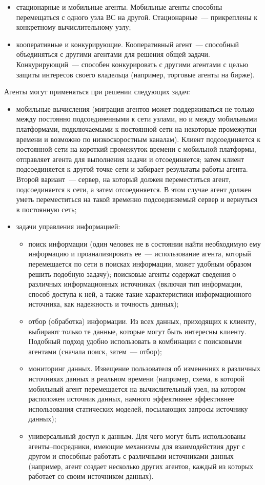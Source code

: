 \begin{itemize}
    \item стационарные и мобильные агенты. Мобильные агенты способны перемещаться с одного узла ВС на другой. Стационарные~--- прикреплены к конкретному вычислительному узлу;

    \item кооперативные и конкурирующие. Кооперативный агент~--- способный объединяться с другими агентами для решения общей задачи. Конкурирующий~--- способен конкурировать с другими агентами с целью защиты интересов своего владельца (например, торговые агенты на бирже).
\end{itemize}

Агенты могут применяться при решении следующих задач:
\begin{itemize}
\item мобильные вычисления (миграция агентов может поддерживаться не только между постоянно подсоединенными к сети узлами, но и между мобильными платформами, подключаемыми к постоянной сети на некоторые промежутки времени и возможно по низкоскоростным каналам). Клиент подсоединяется к постоянной сети на короткий промежуток времени с мобильной платформы, отправляет агента для выполнения задачи и отсоединяется; затем клиент подсоединяется к другой точке сети и забирает результаты работы агента. Второй вариант~--- сервер, на который должен переместиться агент, подсоединяется к сети, а затем отсоединяется. В этом случае агент должен уметь переместиться на такой временно подсоединяемый сервер и вернуться в постоянную сеть;
\item задачи управления информацией:
    \begin{itemize}
    \item поиск информации (один человек не в состоянии найти необходимую ему информацию и проанализировать ее~--- использование агента, который перемещается по сети в поисках информации, может удобным образом решить подобную задачу); поисковые агенты содержат сведения о различных информационных источниках (включая тип информации, способ доступа к ней, а также такие характеристики информационного источника, как надежность и точность данных);
    \item отбор (обработка) информации. Из всех данных, приходящих к клиенту, выбирают только те данные, которые могут быть интересны клиенту. Подобный подход удобно использовать в комбинации с поисковыми агентами (сначала поиск, затем~--- отбор);
    \item мониторинг данных. Извещение пользователя об изменениях в различных источниках данных в реальном времени (например, схема, в которой мобильный агент перемещается на вычислительный узел, на котором расположен источник данных, намного эффективнее эффективнее использования статических моделей, посылающих запросы источнику данных);
    \item универсальный доступ к данным. Для чего могут быть использованы агенты–посредники, имеющие механизмы для взаимодействия друг с другом и способные работать с различными источниками данных (например, агент создает несколько других агентов, каждый из которых работает со своим источником данных).
    \end{itemize}
\end{itemize}

